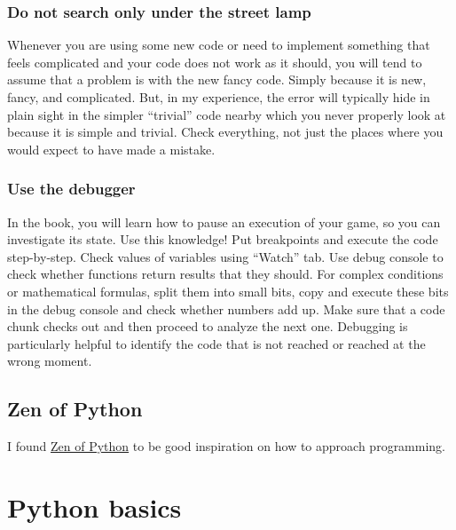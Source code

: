 \documentclass[
]{book}
\begin{document}
\hypertarget{do-not-search-only-under-the-street-lamp}{%
\subsection{Do not search only under the street lamp}\label{do-not-search-only-under-the-street-lamp}}

Whenever you are using some new code or need to implement something that feels complicated and your code does not work as it should, you will tend to assume that a problem is with the new fancy code. Simply because it is new, fancy, and complicated. But, in my experience, the error will typically hide in plain sight in the simpler ``trivial'' code nearby which you never properly look at because it is simple and trivial. Check everything, not just the places where you would expect to have made a mistake.

\hypertarget{use-the-debugger}{%
\subsection{Use the debugger}\label{use-the-debugger}}

In the book, you will learn how to pause an execution of your game, so you can investigate its state. Use this knowledge! Put breakpoints and execute the code step-by-step. Check values of variables using ``Watch'' tab. Use debug console to check whether functions return results that they should. For complex conditions or mathematical formulas, split them into small bits, copy and execute these bits in the debug console and check whether numbers add up. Make sure that a code chunk checks out and then proceed to analyze the next one. Debugging is particularly helpful to identify the code that is not reached or reached at the wrong moment.

\hypertarget{zen-of-python}{%
\section{Zen of Python}\label{zen-of-python}}

I found \href{https://www.python.org/dev/peps/pep-0020/}{Zen of Python} to be good inspiration on how to approach programming.

\hypertarget{python-basics}{%
\chapter{Python basics}\label{python-basics}}
\end{document}

